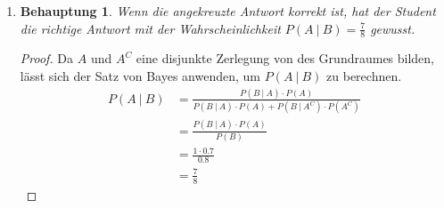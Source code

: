 \documentclass[a4paper]{scrartcl}
\newtheorem*{behaupt}{Behauptung}
\begin{document}
\begin{enumerate}[label=\bfseries\arabic*.]
\begin{enumerate}[label=(\alph*)]
            \item
                \begin{behaupt}
                    Wenn die angekreuzte Antwort korrekt ist, hat der Student
                    die richtige Antwort mit der Wahrscheinlichkeit
                    $P(A\ |\ B) = \frac{7}{8}$ gewusst.
                \end{behaupt}
                \begin{proof}
                    Da $A$ und $A^C$ eine disjunkte Zerlegung von des
                    Grundraumes bilden, lässt sich der Satz von Bayes anwenden,
                    um $P(A\ |\ B)$ zu berechnen.
                    \begin{equation*}
                        \begin{split}
                            P(A\ |\ B) &= \frac{P(B\ |\ A) \cdot P(A)}
                            {P(B\ |\ A) \cdot P(A) + P(B\ |\ A^C) \cdot P(A^C)}
                            \\
                            &= \frac{P(B\ |\ A) \cdot P(A)}{P(B)} \\
                            &= \frac{1 \cdot \num{0.7}}{\num{0.8}} \\
                            &= \frac{7}{8}
                        \end{split}
                    \end{equation*}
                \end{proof}

        \end{enumerate}


\end{enumerate}
\end{document}
